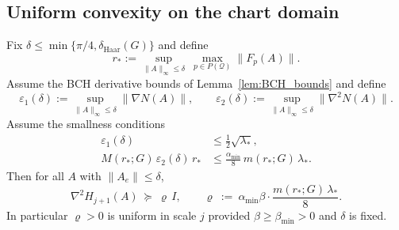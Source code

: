 \subsection{Uniform convexity on the chart domain}

\begin{theorem}\label{thm:uniform_convexity}
Fix $\delta\le \min\{\pi/4,\delta_{\mathrm{Haar}}(G)\}$ and define
\[
r_\ast:=\sup_{\|A\|_{\infty}\le \delta}\ \max_{p\in P(\mathcal Q)} \|F_p(A)\|.
\]
Assume the BCH derivative bounds of Lemma~\ref{lem:BCH_bounds} and define
\[
\varepsilon_1(\delta):=\sup_{\|A\|_\infty\le \delta}\|\nabla N(A)\|,
\qquad
\varepsilon_2(\delta):=\sup_{\|A\|_\infty\le \delta}\|\nabla^2 N(A)\|.
\]
Assume the smallness conditions
\begin{align}
\varepsilon_1(\delta)&\le \tfrac12\sqrt{\lambda_\ast},\label{eq:small1}\\
M(r_\ast;G)\,\varepsilon_2(\delta)\,r_\ast&\le \tfrac{\alpha_{\min}}{8}\,m(r_\ast;G)\,\lambda_\ast.\label{eq:small2}
\end{align}
Then for all $A$ with $\|A_e\|\le \delta$,
\begin{equation}\label{eq:Hess_lb_final}
\nabla^2 H_{j+1}(A)\ \succeq\ \varrho\,I,
\qquad
\varrho\ :=\ \alpha_{\min}\beta\cdot \frac{m(r_\ast;G)\,\lambda_\ast}{8}.
\end{equation}
In particular $\varrho>0$ is uniform in scale $j$ provided $\beta\ge \beta_{\min}>0$ and $\delta$ is fixed.
\end{theorem}

